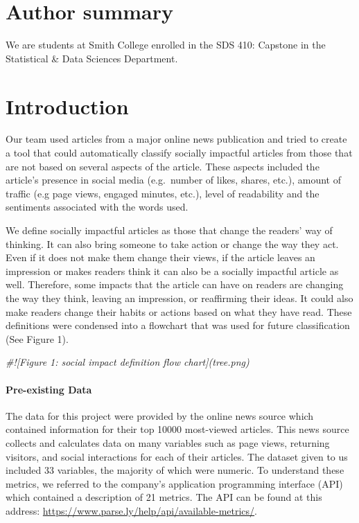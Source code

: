 \documentclass[10pt,letterpaper]{article}
\newenvironment{Shaded}{\begin{snugshade}}{\end{snugshade}}
\newcommand{\CommentTok}[1]{\textcolor[rgb]{0.56,0.35,0.01}{\textit{#1}}}
\begin{document}
\section*{Author summary}
We are students at Smith College enrolled in the SDS 410: Capstone in
the Statistical \& Data Sciences Department.

\linenumbers

\section{Introduction}\label{introduction}

Our team used articles from a major online news publication and tried to
create a tool that could automatically classify socially impactful
articles from those that are not based on several aspects of the
article. These aspects included the article's presence in social media
(e.g.~number of likes, shares, etc.), amount of traffic (e.g page views,
engaged minutes, etc.), level of readability and the sentiments
associated with the words used.

We define socially impactful articles as those that change the readers'
way of thinking. It can also bring someone to take action or change the
way they act. Even if it does not make them change their views, if the
article leaves an impression or makes readers think it can also be a
socially impactful article as well. Therefore, some impacts that the
article can have on readers are changing the way they think, leaving an
impression, or reaffirming their ideas. It could also make readers
change their habits or actions based on what they have read. These
definitions were condensed into a flowchart that was used for future
classification (See Figure 1).

\begin{Shaded}
\begin{Highlighting}[]
\CommentTok{#![Figure 1: social impact definition flow chart](tree.png)}
\end{Highlighting}
\end{Shaded}

\paragraph{Pre-existing Data}\label{pre-existing-data}

The data for this project were provided by the online news source which
contained information for their top 10000 most-viewed articles. This
news source collects and calculates data on many variables such as page
views, returning visitors, and social interactions for each of their
articles. The dataset given to us included 33 variables, the majority of
which were numeric. To understand these metrics, we referred to the
company's application programming interface (API) which contained a
description of 21 metrics. The API can be found at this address:
\url{https://www.parse.ly/help/api/available-metrics/}.
\end{document}
